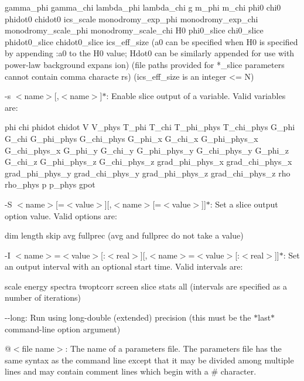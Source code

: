 \begin{DoxyItemize}
\begin{DoxyCode}
        gamma_phi
        gamma_chi
        lambda_phi
        lambda_chi
        g
        m_phi
        m_chi
        phi0
        chi0
        phidot0
        chidot0
        ics_scale
        monodromy_exp_phi
        monodromy_exp_chi
        monodromy_scale_phi
        monodromy_scale_chi
        H0
        phi0_slice
        chi0_slice
        phidot0_slice
        chidot0_slice
        ics_eff_size
        (a0 can be specified when H0 is specified by appending :\<a0\> to the H0 
      value;
         Hdot0 can be similarly appended for use with power-law background expans
      ion)
        (file paths provided for *_slice parameters cannot contain comma characte
      rs)
        (ics_eff_size is an integer <= N)
\end{DoxyCode}
 \item -\/s $<$name$>$\mbox{[},$<$name$>$\mbox{]}$\ast$: Enable slice output of a variable. Valid variables are: 
\begin{DoxyCode}
        phi
        chi
        phidot
        chidot
        V
        V_phys
        T_phi
        T_chi
        T_phi_phys
        T_chi_phys
        G_phi
        G_chi
        G_phi_phys
        G_chi_phys
        G_phi_x
        G_chi_x
        G_phi_phys_x
        G_chi_phys_x
        G_phi_y
        G_chi_y
        G_phi_phys_y
        G_chi_phys_y
        G_phi_z
        G_chi_z
        G_phi_phys_z
        G_chi_phys_z
        grad_phi_phys_x
        grad_chi_phys_x
        grad_phi_phys_y
        grad_chi_phys_y
        grad_phi_phys_z
        grad_chi_phys_z
        rho
        rho_phys
        p
        p_phys
        gpot
\end{DoxyCode}
 \item -\/S $<$name$>$\mbox{[}=$<$value$>$\mbox{]}\mbox{[},$<$name$>$\mbox{[}=$<$value$>$\mbox{]}\mbox{]}$\ast$: Set a slice output option value. Valid options are: 
\begin{DoxyCode}
        dim
        length
        skip
        avg
        fullprec
        (avg and fullprec do not take a value)
\end{DoxyCode}
 \item -\/I $<$name$>$=$<$value$>$\mbox{[}:$<$real$>$\mbox{]}\mbox{[},$<$name$>$=$<$value$>$\mbox{[}:$<$real$>$\mbox{]}\mbox{]}$\ast$: Set an output interval with an optional start time. Valid intervals are: 
\begin{DoxyCode}
        scale
        energy
        spectra
        twoptcorr
        screen
        slice
        stats
        all
        (intervals are specified as a number of iterations)
\end{DoxyCode}
 \item -\/-\/long: Run using long-\/double (extended) precision (this must be the $\ast$last$\ast$ command-\/line option argument) \item @$<$file name$>$: The name of a parameters file. The parameters file has the same syntax as the command line except that it may be divided among multiple lines and may contain comment lines which begin with a \# character.\end{DoxyItemize}
